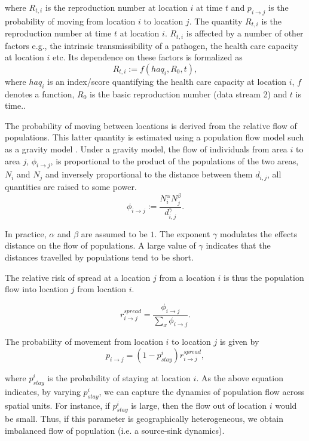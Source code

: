 \documentclass[a4paper,12pt]{article}
\begin{document}
where \(R_{t, i}\) is the reproduction number at location \(i\) at time
\(t\) and \(p_{i \rightarrow j}\) is the probability of moving from
location \(i\) to location \(j\). The quantity $R_{t, i}$ is the
reproduction number at time $t$ at location $i$. $R_{t, i}$ is
affected by a number of other factors e.g., the intrinsic
transmissibility of a pathogen, the health care capacity at location
$i$ etc. Its dependence on these factors is formalized as
\[ R_{t, i} := f(haq_i, R_0, t),\]
where $haq_i$ is an index/score quantifying the health care capacity at location 
$i$, $f$ denotes a function, $R_0$ is the basic reproduction number (data stream 2) and $t$ is time..

The probability of moving between locations is derived from the
relative flow of populations.
This latter quantity is estimated using a population flow
model such as a gravity model \citep{grosche2007175}. Under a gravity model, the flow of individuals from area \(i\) to area \(j\),
\(\phi_{i \rightarrow j}\), is proportional to the product of the
populations of the two areas, \(N_i\) and \(N_j\) and inversely
proportional to the distance between them \(d_{i, j}\), all quantities
are raised to some power.
\[
  \phi_{i \rightarrow j} :=  \frac{N_i^{\alpha}N_j^{\beta}}{d_{i, j}^{\gamma}}.
\]

In practice, \( \alpha \) and \( \beta \) are assumed to be $1$. The
exponent \( \gamma \) modulates the effects distance on the flow of
populations. A large value of \( \gamma \) indicates that the
distances travelled by populations tend to be short.

The relative risk of spread at a location \(j\) from a location \(i\)
is thus the population flow into location \(j\) from location \(i\).

\[
  r_{i \rightarrow j}^{spread} = \frac{\phi_{i \rightarrow
  j}}{\sum_{x}{\phi_{i \rightarrow
  j}}}.
\]

The probability of movement from location \(i\) to location \(j\) is given by
\[  p_{i \rightarrow j} = (1 - p_{stay}^i) r_{i \rightarrow j}^{spread},\]

where \(p_{stay}^i\) is the probability of staying at location
\(i\). As the above equation indicates, by varying $p_{stay}^i$, we
can capture the dynamics of population flow across spatial units. For
instance, if \(p_{stay}^i\) is large, then the flow out of location
\(i\) would be small. Thus, if this parameter is geographically
heterogeneous, we obtain imbalanced flow of population (i.e. a source-sink dynamics). 
\end{document}
